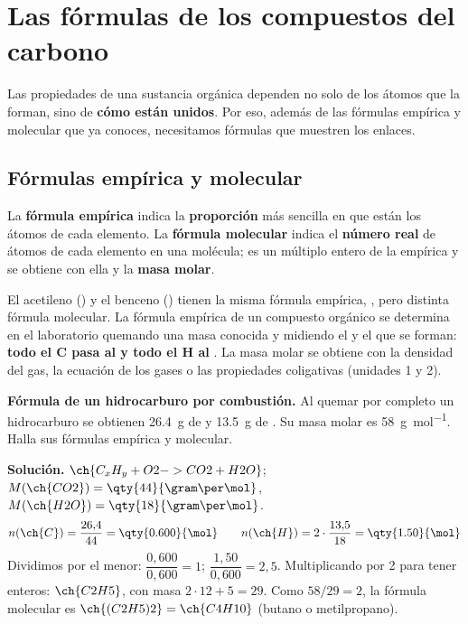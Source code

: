 \section{Las fórmulas de los compuestos del carbono}\label{sec:ud7-formulas}

Las propiedades de una sustancia orgánica dependen no solo de los átomos que la forman, sino de \textbf{cómo están unidos}. Por eso,
además de las fórmulas empírica y molecular que ya conoces, necesitamos fórmulas que muestren los enlaces.

\subsection{Fórmulas empírica y molecular}

\begin{definition}
    La \textbf{fórmula empírica} indica la \textbf{proporción} más sencilla en que están los átomos de cada elemento. La
    \textbf{fórmula molecular} indica el \textbf{número real} de átomos de cada elemento en una molécula; es un múltiplo entero de
    la empírica y se obtiene con ella y la \textbf{masa molar}.
\end{definition}

El acetileno () y el benceno () tienen la misma fórmula empírica, , pero distinta fórmula molecular. La
fórmula empírica de un compuesto orgánico se determina en el laboratorio quemando una masa conocida y midiendo el  y el
 que se forman: \textbf{todo el C pasa al  y todo el H al }. La masa molar se obtiene con la densidad del
gas, la ecuación de los gases o las propiedades coligativas (unidades 1 y 2).

\begin{example}
    \textbf{Fórmula de un hidrocarburo por combustión.} Al quemar por completo un hidrocarburo se obtienen \qty{26.4}{\gram} de
     y \qty{13.5}{\gram} de . Su masa molar es \qty{58}{\gram\per\mol}. Halla sus fórmulas empírica y molecular.

    \textbf{Solución.} \(\ch{C_xH_y + O2 -> CO2 + H2O}\); \(M(\ch{CO2}) = \qty{44}{\gram\per\mol}\), \(M(\ch{H2O}) =
    \qty{18}{\gram\per\mol}\).
    \[ n(\ch{C}) = \frac{26{,}4}{44} = \qty{0.600}{\mol} \qquad n(\ch{H}) = 2 \cdot \frac{13{,}5}{18} = \qty{1.50}{\mol} \]
    Dividimos por el menor: \(\dfrac{0{,}600}{0{,}600} = 1\); \(\dfrac{1{,}50}{0{,}600} = 2{,}5\). Multiplicando por 2 para tener
    enteros: \(\ch{C2H5}\), con masa \(2 \cdot 12 + 5 = 29\). Como \(58/29 = 2\), la fórmula molecular es \(\ch{(C2H5)2} =
    \ch{C4H10}\) (butano o metilpropano).
\end{example}

